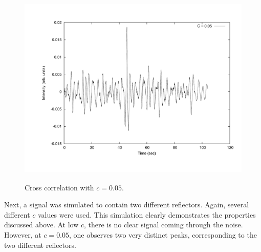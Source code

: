 \documentclass[12pt]{article}
\begin{document}
\begin{figure}[!h]
\centering
\includegraphics[width =120 mm, height = 95mm]{Ex_6_25_cross5.pdf}
\caption{Cross correlation with $c=0.05$.}
\label{fig:6255}
\end{figure}

Next, a signal was simulated to contain two different reflectors.  Again, several different $c$ values were used.  This simulation clearly demonstrates the properties discussed above.  At low $c$, there is no clear signal coming through the noise.  However, at $c=0.05$, one observes two very distinct peaks, corresponding to the two different reflectors.
\end{document}
